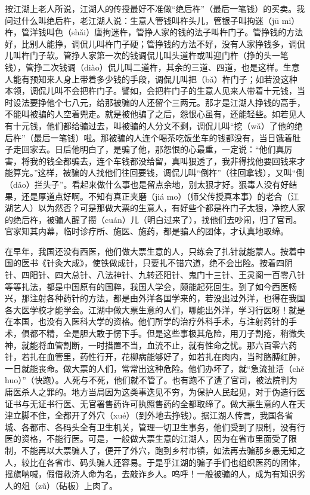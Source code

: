 \documentclass[12pt,UTF8]{ctexbook}
\begin{document}
按江湖上老人所说，江湖人的传授最好不准做“绝后杵”（最后一笔钱）的买卖。我问过什么叫绝后杵，老江湖人说：生意人管钱叫杵头儿，管银子叫拘迷（jū mi）杵，管洋钱叫色（shǎi）唐拘迷杵，管挣人家的钱的法子叫杵门子。管挣钱的方法好，比别人能挣，调侃儿叫杵门子硬；管挣钱的方法不好，没有人家挣钱多，调侃儿叫杵门子软。管挣人家第一次的钱调侃儿叫头道杵或叫迎门杵（挣的头一笔钱），管挣二次钱调（diào）侃儿叫二道杵，其余的三道、四道，也是这样。生意人能有预知来人身上带着多少钱的手段，调侃儿叫把（bǎ）杵门子；如若没这种本领，调侃儿叫不会把杵门子。譬如，会把杵门子的生意人见来人带着十元钱，当时设法要挣他个七八元，给那被骗的人还留个三两元。那才是江湖人挣钱的高手，不能叫被骗的人空着兜走。就是被他骗了之后，怨恨心虽有，还能轻些。如若见人有十元钱，他们都给骗过去，叫被骗的人分文不剩，调侃儿叫“挖（wǎ）了他的绝后杵”（最后一笔钱）啦。那被骗的人连个喝茶吃饭坐车的钱都没有，当日饿着肚子走回家去。日后他明白了，是骗了他，那怨恨的心最重，一定说：“他们真厉害，将我的钱全都骗去，连个车钱都没给留，真叫狠透了，我非得找他要回钱来才能算完。”这样，被骗的人找他们往回要钱，调侃儿叫“倒杵”（往回拿钱），又叫“倒（dǎo）拦头子”。看起来做什么事也是留点余地，别太狠才好。狠毒人没有好结果，还是厚道点好啊。不知有真正夹磨（jiá mo）（师父传授真本事）的老合（江湖艺人）以为然否？可是那做大票的生意人，有好些个都是杵门子太狠，净挖人家的绝后杵，被骗人醒了攒（cuán）儿（明白过来了），找他们去吵闹，归了官司。官家知其内幕，临时诊疗所、施医、施药，都是骗人的团体，才认真地取缔。

在早年，我国还没有西医，他们做大票生意的人，只练会了扎针就能蒙人。按着中国的医书《针灸大成》，使铁做成针，只要扎不错穴道，绝不会出险。按着四阴针、四阳针、四大总针、八法神针、九转还阳针、鬼门十三针、王灵阁一百零八针等等扎法，都是中国原有的国粹，我国人学会，颇能起死回生。到了如今西医畅兴，那注射各种药针的方法，都是由外洋各国学来的，若没出过外洋，也得在我国各大医学校才能学会。江湖中做大票生意的人们，哪能出外洋，学习行医呀！就是在本国，也没有入医科大学的资格。他们所学的治疗外科手术，与注射药针的手术，俱都不精，全是胆大敢于愣下手。但是这些事极其危险，用刀子割疮，稍微失神，就能将血管割断，一时措置不当，血流不止，就有性命之忧。那六百零六药针，若扎在血管里，药性行开，花柳病能够好了，如若扎在肉内，当时胳膊红肿，一日就能丧命。做大票的人们，常常出这种危险。他们办坏了，就“急流扯活（chě huo）”（快跑）。人死与不死，他们就不管了。也有跑不了遭了官司，被法院判为庸医杀人之罪的。地方当局因为这类事迭见不穷，为保护人民起见，对于伪造行医证书与无证书行医、无官署售药许可执照售药的全都取缔了。做大票生意的人在天津立脚不住，全都开了外穴（xué）（到外地去挣钱）。据江湖人传言，我国各省城、各都市、各码头全有卫生机关，管理一切卫生事务，他们受到了限制，没有行医的资格，不能行医。可是，一般做大票生意的江湖人，因为在省市里面受了限制，不能再以大票骗人了，便开了外穴，跑到乡村市镇，如法再去骗那乡愚无知之人，较比在各省市、码头骗人还容易。于是乎江湖的骗子手们也组织医药的团体，摇旗呐喊，假借救济人命为名，去敲诈乡人。呜呼！一般被骗的人，成为有知识劣人的俎（zǔ）（砧板）上肉了。
\end{document}
